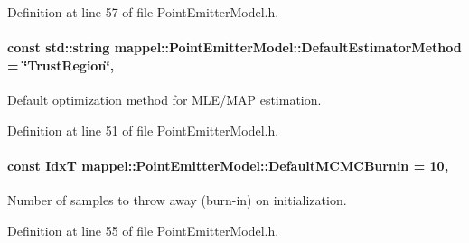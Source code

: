 Definition at line 57 of file Point\+Emitter\+Model.\+h.

\paragraph[{\texorpdfstring{Default\+Estimator\+Method}{DefaultEstimatorMethod}}]{\setlength{\rightskip}{0pt plus 5cm}const std\+::string mappel\+::\+Point\+Emitter\+Model\+::\+Default\+Estimator\+Method = \char`\"{}Trust\+Region\char`\"{}\hspace{0.3cm}{\ttfamily [static]}, {\ttfamily [inherited]}}\hypertarget{classmappel_1_1PointEmitterModel_aa90f02cfd2af6acf4d8ba3bbfbe906e5}{}\label{classmappel_1_1PointEmitterModel_aa90f02cfd2af6acf4d8ba3bbfbe906e5}


Default optimization method for M\+L\+E/\+M\+AP estimation. 



Definition at line 51 of file Point\+Emitter\+Model.\+h.

\paragraph[{\texorpdfstring{Default\+M\+C\+M\+C\+Burnin}{DefaultMCMCBurnin}}]{\setlength{\rightskip}{0pt plus 5cm}const {\bf IdxT} mappel\+::\+Point\+Emitter\+Model\+::\+Default\+M\+C\+M\+C\+Burnin = 10\hspace{0.3cm}{\ttfamily [static]}, {\ttfamily [inherited]}}\hypertarget{classmappel_1_1PointEmitterModel_a6fc96e398771a33d5586c2af10a2e6d8}{}\label{classmappel_1_1PointEmitterModel_a6fc96e398771a33d5586c2af10a2e6d8}


Number of samples to throw away (burn-\/in) on initialization. 



Definition at line 55 of file Point\+Emitter\+Model.\+h.

